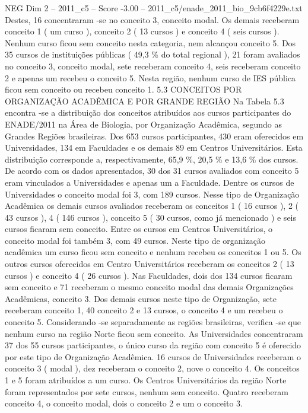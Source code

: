 \begin{textsample}{NEG Dim 2 – 2011\_c5 – Score -3.00 – 2011\_c5/enade\_2011\_bio\_9cb6f4229e.txt}
Destes, 16 concentraram -se no conceito 3, conceito modal.
Os demais receberam conceito 1 ( um curso ), conceito 2 ( 13 cursos ) e conceito 4 ( seis cursos ).
Nenhum curso ficou sem conceito nesta categoria, nem alcançou conceito 5.
Dos 35 cursos de instituições públicas ( 49,3 \% do total regional ), 21 foram avaliados no conceito 3, conceito modal, sete receberam conceito 4, seis receberam conceito 2 e apenas um recebeu o conceito 5.
Nesta região, nenhum curso de IES pública ficou sem conceito ou recebeu conceito 1. 5.3 CONCEITOS POR ORGANIZAÇÃO ACADÊMICA E POR GRANDE REGIÃO Na Tabela 5.3 encontra -se a distribuição dos conceitos atribuídos aos cursos participantes do ENADE/2011 na Área de Biologia, por Organização Acadêmica, segundo as Grandes Regiões brasileiras.
Dos 653 cursos participantes, 430 eram oferecidos em Universidades, 134 em Faculdades e os demais 89 em Centros Universitários.
Esta distribuição corresponde a, respectivamente, 65,9 \%, 20,5 \% e 13,6 \% dos cursos.
De acordo com os dados apresentados, 30 dos 31 cursos avaliados com conceito 5 eram vinculados a Universidades e apenas um a Faculdade.
Dentre os cursos de Universidades o conceito modal foi 3, com 189 cursos.
Nesse tipo de Organização Acadêmica os demais cursos avaliados receberam os conceitos 1 ( 16 cursos ), 2 ( 43 cursos ), 4 ( 146 cursos ), conceito 5 ( 30 cursos, como já mencionado ) e seis cursos ficaram sem conceito.
Entre os cursos em Centros Universitários, o conceito modal foi também 3, com 49 cursos.
Neste tipo de organização acadêmica um curso ficou sem conceito e nenhum recebeu os conceitos 1 ou 5.
Os outros cursos oferecidos em Centro Universitários receberam os conceitos 2 ( 13 cursos ) e conceito 4 ( 26 cursos ).
Nas Faculdades, dois dos 134 cursos ficaram sem conceito e 71 receberam o mesmo conceito modal das demais Organizações Acadêmicas, conceito 3.
Dos demais cursos neste tipo de Organização, sete receberam conceito 1, 40 conceito 2 e 13 cursos, o conceito 4 e um recebeu o conceito 5.
Considerando -se separadamente as regiões brasileiras, verifica -se que nenhum curso na região Norte ficou sem conceito.
As Universidades concentraram 37 dos 55 cursos participantes, o único curso da região com conceito 5 é oferecido por este tipo de Organização Acadêmica. 16 cursos de Universidades receberam o conceito 3 ( modal ), dez receberam o conceito 2, nove o conceito 4.
Os conceitos 1 e 5 foram atribuídos a um curso.
Os Centros Universitários da região Norte foram representados por sete cursos, nenhum sem conceito.
Quatro receberam conceito 4, o conceito modal, dois o conceito 2 e um o conceito 3.

\end{textsample}

